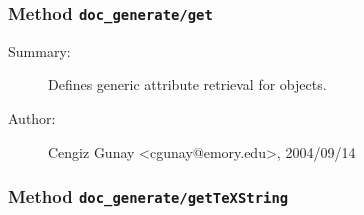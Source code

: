 \subsubsection[Method \texttt{get}]{Method \texttt{doc\_generate/get}}%
%
\label{ref_doc_generate__get}%
\hypertarget{ref_doc_generate__get}{}%
\begin{description}
\item[Summary:]Defines generic attribute retrieval for objects.
%
%
%
%
%
%
%
\item[Author:]%
Cengiz Gunay <cgunay@emory.edu>, 2004/09/14
%
\end{description}
\methodline%
\subsubsection[Method \texttt{getTeXString}]{Method \texttt{doc\_generate/getTeXString}}%
%
\label{ref_doc_generate__getTeXString}%
\hypertarget{ref_doc_generate__getTeXString}{}%
